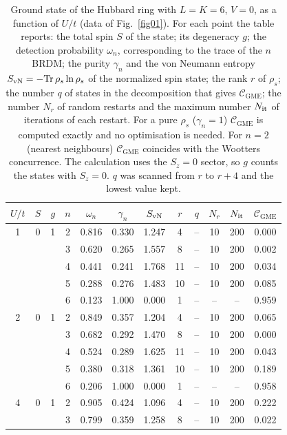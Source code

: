 \documentclass[12pt]{article}
\begin{document}
\begin{table}
\caption{Ground state of the Hubbard ring with $L=K=6$, $V=0$, as a function of $U/t$ (data of Fig.~\ref{fig01}). For each point the table reports: the total spin $S$ of the state; its degeneracy $g$; the detection probability $\omega_n$, corresponding to the trace of the $n$BRDM; the purity $\gamma_n$ and the von Neumann entropy $S_{\rm vN}=-\mathrm{Tr}\,\rho_s\ln\rho_s$ of the normalized spin state; the rank $r$ of $\rho_s$; the number $q$ of states in the decomposition that gives $\mathcal{C}_{\mathrm{GME}}$; the number $N_r$ of random restarts and the maximum number $N_{\rm it}$ of iterations of each restart. For a pure $\rho_s$ ($\gamma_n=1$) $\mathcal{C}_{\mathrm{GME}}$ is computed exactly and no optimisation is needed. For $n=2$ (nearest neighbours) $\mathcal{C}_{\mathrm{GME}}$ coincides with the Wootters concurrence. The calculation uses the $S_z=0$ sector, so $g$ counts the states with $S_z=0$. $q$ was scanned from $r$ to $r+4$ and the lowest value kept. }
\label{tab:uscan_gs_L6}
\begin{ruledtabular}
\begin{tabular}{cccccccccccc}
$U/t$ & $S$ & $g$ & $n$ & $\omega_n$ & $\gamma_n$ & $S_{\rm vN}$ & $r$ & $q$ & $N_r$ & $N_{\rm it}$ & $\mathcal{C}_{\mathrm{GME}}$ \\
\hline
1 & 0 & 1 & 2 & 0.816 & 0.330 & 1.247 & 4 & -- & 10 & 200 & 0.000 \\
 & &  & 3 & 0.620 & 0.265 & 1.557 & 8 & -- & 10 & 200 & 0.002 \\
 & &  & 4 & 0.441 & 0.241 & 1.768 & 11 & -- & 10 & 200 & 0.034 \\
 & &  & 5 & 0.288 & 0.276 & 1.483 & 10 & -- & 10 & 200 & 0.085 \\
 & &  & 6 & 0.123 & 1.000 & 0.000 & 1 & -- & -- & -- & 0.959 \\
\hline
2 & 0 & 1 & 2 & 0.849 & 0.357 & 1.204 & 4 & -- & 10 & 200 & 0.065 \\
 & &  & 3 & 0.682 & 0.292 & 1.470 & 8 & -- & 10 & 200 & 0.000 \\
 & &  & 4 & 0.524 & 0.289 & 1.625 & 11 & -- & 10 & 200 & 0.043 \\
 & &  & 5 & 0.380 & 0.318 & 1.361 & 10 & -- & 10 & 200 & 0.189 \\
 & &  & 6 & 0.206 & 1.000 & 0.000 & 1 & -- & -- & -- & 0.958 \\
\hline
4 & 0 & 1 & 2 & 0.905 & 0.424 & 1.096 & 4 & -- & 10 & 200 & 0.222 \\
 & &  & 3 & 0.799 & 0.359 & 1.258 & 8 & -- & 10 & 200 & 0.022 \\

\end{tabular}
\end{ruledtabular}
\end{table}
\end{document}
